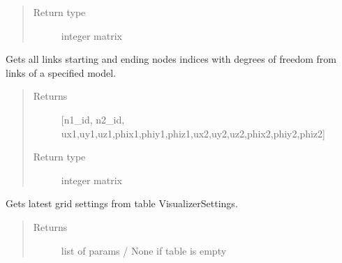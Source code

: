 \documentclass[letterpaper,10pt,english]{sphinxmanual}
\begin{document}
\begin{fulllineitems}
\begin{fulllineitems}
\begin{quote}
\begin{description}
\item[{Return type}] \leavevmode
integer matrix

\end{description}\end{quote}

\end{fulllineitems}


\begin{fulllineitems}
\label{\detokenize{api:beamon.database.database.Database.get_edof_for_simulation}}
Gets all links starting and ending nodes indices with degrees of freedom from links of a specified model.
\begin{quote}\begin{description}
\item[{Returns}] \leavevmode
{[}n1\_id, n2\_id, ux1,uy1,uz1,phix1,phiy1,phiz1,ux2,uy2,uz2,phix2,phiy2,phiz2{]}

\item[{Return type}] \leavevmode
integer matrix

\end{description}\end{quote}

\end{fulllineitems}


\begin{fulllineitems}
\label{\detokenize{api:beamon.database.database.Database.get_grid_settings}}
Gets latest grid settings from table VisualizerSettings.
\begin{quote}\begin{description}
\item[{Returns}] \leavevmode
list of params / None if table is empty

\end{description}\end{quote}

\end{fulllineitems}


\end{fulllineitems}
\end{document}
